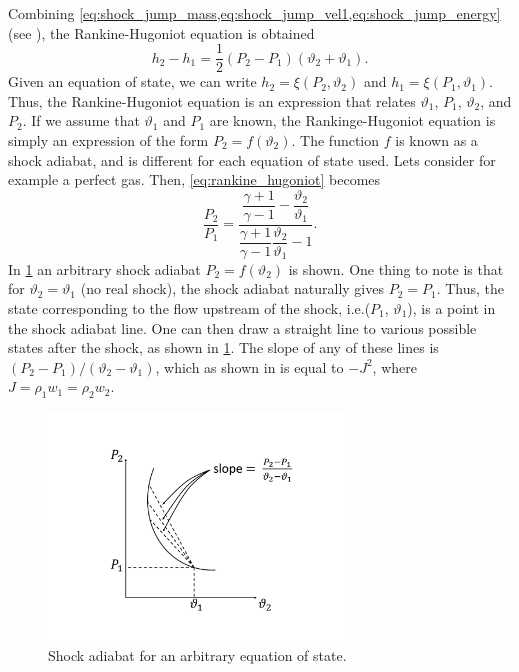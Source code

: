 \documentclass[oneside,a4paper,11pt]{report}
\begin{document}
Combining \cref{eq:shock_jump_mass,eq:shock_jump_vel1,eq:shock_jump_energy} (see \cite{thompson1988}), the Rankine-Hugoniot equation is obtained
\begin{equation}
\label{eq:rankine_hugoniot}
    h_2 - h_1 = \frac{1}{2} \left ( P_2 - P_1 \right) (\vartheta_2 + \vartheta_1 ).
\end{equation}
Given an equation of state, we can write $h_2 = \xi(P_2,\vartheta_2)$ and $h_1 = \xi(P_1,\vartheta_1)$. Thus, the Rankine-Hugoniot equation is an expression that relates $\vartheta_1$, $P_1$, $\vartheta_2$, and $P_2$. If we assume that $\vartheta_1$ and $P_1$ are known, the Rankinge-Hugoniot equation is simply an expression of the form $P_2 = f(\vartheta_2)$. The function $f$ is known as a shock adiabat, and is different for each equation of state used. Lets consider for example a perfect gas. Then, \cref{eq:rankine_hugoniot} becomes
\begin{equation}
    \frac{P_2}{P_1} = \frac{ \dfrac{\gamma + 1}{\gamma - 1} - \dfrac{\vartheta_2}{\vartheta_1} }{ \dfrac{\gamma + 1}{\gamma - 1} \dfrac{\vartheta_2}{\vartheta_1} - 1 }.
\end{equation}
In \cref{fig:shock_adiabat} an arbitrary shock adiabat $P_2 = f(\vartheta_2)$ is shown. One thing to note is that for $\vartheta_2 = \vartheta_1$ (no real shock), the shock adiabat naturally gives $P_2 = P_1$. Thus, the state corresponding to the flow upstream of the shock, i.e.\@ ($P_1$, $\vartheta_1$), is a point in the shock adiabat line. One can then draw a straight line to various possible states after the shock, as shown in \cref{fig:shock_adiabat}. The slope of any of these lines is $(P_2 - P_1)/(\vartheta_2 - \vartheta_1)$, which as shown in \cite{thompson1988} is equal to $-J^2$, where $J = \rho_1 w_1 = \rho_2 w_2$.
\begin{figure}[ht]
   \centering
   \includegraphics[width=0.7\textwidth]{../../images/shock_adiabat.pdf}
   \caption{Shock adiabat for an arbitrary equation of state.}
   \label{fig:shock_adiabat}
\end{figure}
\end{document}
